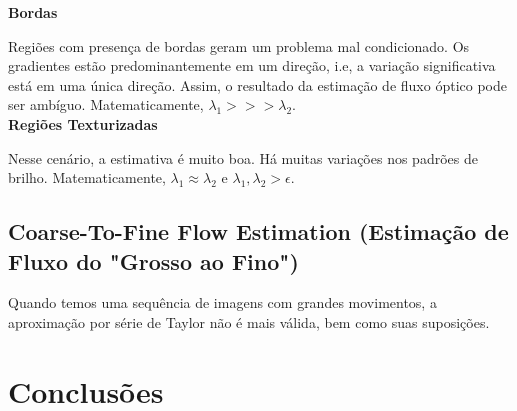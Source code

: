 \documentclass[12pt, a4paper]{article}
\begin{document}
\textbf{Bordas}

Regiões com presença de bordas geram um problema mal condicionado. Os gradientes estão predominantemente em um direção, i.e, a variação significativa está em uma única direção. Assim, o resultado da estimação de fluxo óptico pode ser ambíguo. Matematicamente, $\lambda_1 >>> \lambda_2$. \\

\textbf{Regiões Texturizadas}

Nesse cenário, a estimativa é muito boa. Há muitas variações nos padrões de brilho. Matematicamente, $\lambda_1 \approx \lambda_2$ e $\lambda_1, \lambda_2 > \epsilon$.

\subsection{Coarse-To-Fine Flow Estimation (Estimação de Fluxo do "Grosso ao Fino") }

Quando temos uma sequência de imagens com grandes movimentos, a aproximação por série de Taylor não é mais válida, bem como suas suposições.

\section{Conclusões}




\end{document}
